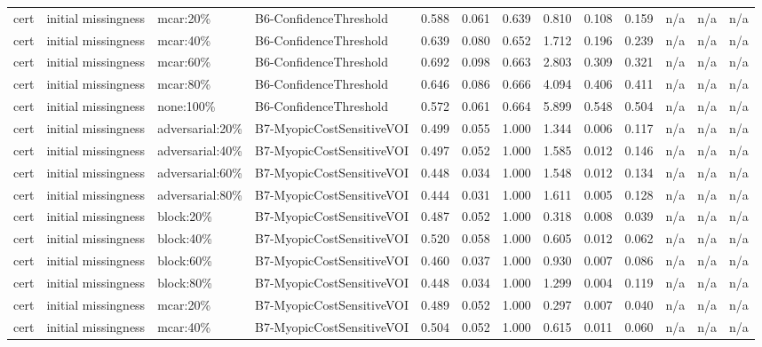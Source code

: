 \begin{table}[!ht]
{\begin{tabular}{lllllllllllll}
cert & initial missingness & mcar:20\% & B6-ConfidenceThreshold & 0.588 & 0.061 & 0.639 & 0.810 & 0.108 & 0.159 & n/a & n/a & n/a \\
cert & initial missingness & mcar:40\% & B6-ConfidenceThreshold & 0.639 & 0.080 & 0.652 & 1.712 & 0.196 & 0.239 & n/a & n/a & n/a \\
cert & initial missingness & mcar:60\% & B6-ConfidenceThreshold & 0.692 & 0.098 & 0.663 & 2.803 & 0.309 & 0.321 & n/a & n/a & n/a \\
cert & initial missingness & mcar:80\% & B6-ConfidenceThreshold & 0.646 & 0.086 & 0.666 & 4.094 & 0.406 & 0.411 & n/a & n/a & n/a \\
cert & initial missingness & none:100\% & B6-ConfidenceThreshold & 0.572 & 0.061 & 0.664 & 5.899 & 0.548 & 0.504 & n/a & n/a & n/a \\
cert & initial missingness & adversarial:20\% & B7-MyopicCostSensitiveVOI & 0.499 & 0.055 & 1.000 & 1.344 & 0.006 & 0.117 & n/a & n/a & n/a \\
cert & initial missingness & adversarial:40\% & B7-MyopicCostSensitiveVOI & 0.497 & 0.052 & 1.000 & 1.585 & 0.012 & 0.146 & n/a & n/a & n/a \\
cert & initial missingness & adversarial:60\% & B7-MyopicCostSensitiveVOI & 0.448 & 0.034 & 1.000 & 1.548 & 0.012 & 0.134 & n/a & n/a & n/a \\
cert & initial missingness & adversarial:80\% & B7-MyopicCostSensitiveVOI & 0.444 & 0.031 & 1.000 & 1.611 & 0.005 & 0.128 & n/a & n/a & n/a \\
cert & initial missingness & block:20\% & B7-MyopicCostSensitiveVOI & 0.487 & 0.052 & 1.000 & 0.318 & 0.008 & 0.039 & n/a & n/a & n/a \\
cert & initial missingness & block:40\% & B7-MyopicCostSensitiveVOI & 0.520 & 0.058 & 1.000 & 0.605 & 0.012 & 0.062 & n/a & n/a & n/a \\
cert & initial missingness & block:60\% & B7-MyopicCostSensitiveVOI & 0.460 & 0.037 & 1.000 & 0.930 & 0.007 & 0.086 & n/a & n/a & n/a \\
cert & initial missingness & block:80\% & B7-MyopicCostSensitiveVOI & 0.448 & 0.034 & 1.000 & 1.299 & 0.004 & 0.119 & n/a & n/a & n/a \\
cert & initial missingness & mcar:20\% & B7-MyopicCostSensitiveVOI & 0.489 & 0.052 & 1.000 & 0.297 & 0.007 & 0.040 & n/a & n/a & n/a \\
cert & initial missingness & mcar:40\% & B7-MyopicCostSensitiveVOI & 0.504 & 0.052 & 1.000 & 0.615 & 0.011 & 0.060 & n/a & n/a & n/a \\

\end{tabular}}
\end{table}
